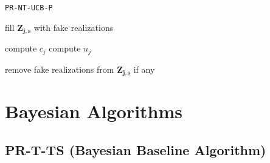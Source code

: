 \begin{algorithm}[H]
	\caption{\texttt{PR-NT-UCB-P}}
	\begin{scriptsize}
		\begin{algorithmic}[1]
			
			
			
			
			\State fill $\boldsymbol{Z_{j,s}}$ with fake realizations
			\EndIf
			
			\EndFor		
			\State compute $c_j$\;
			\State compute $u_j$\;
			
			\State remove fake realizations from $\boldsymbol{Z_{j,s}}$ if any			
			\EndFor
			
	
							
			\EndFor
			
					
			\EndFunction
			
		\end{algorithmic}
	\end{scriptsize}
	\label{alg:Idea2}
\end{algorithm}




\section{Bayesian Algorithms}

\subsection{PR-T-TS (Bayesian Baseline Algorithm)}

